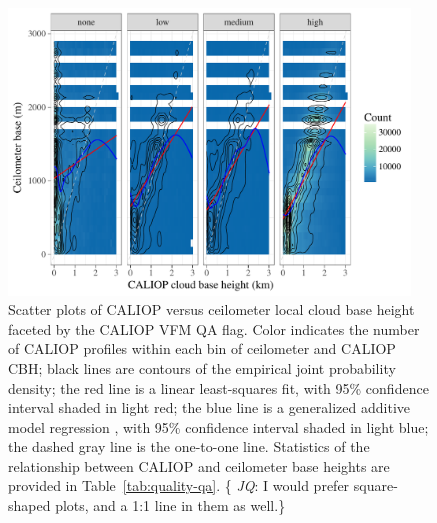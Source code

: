 \documentclass[essd,manuscript]{copernicus}\usepackage[]{graphicx}\usepackage[]{color}
\newcommand{\hlnum}[1]{\textcolor[rgb]{0.686,0.059,0.569}{#1}}%
\newenvironment{knitrout}{}{} %
\newcommand\comment[2]{\{\hlnum{ \textit{#1}: #2}\}}
\begin{document}
\begin{figure}
  \centering
\begin{knitrout}
\color{fgcolor}

{\centering \includegraphics[width=0.95\textwidth]{figure/method-eval-qual-1} 

}



\end{knitrout}
  \caption{Scatter plots of CALIOP versus ceilometer local cloud base height
    faceted by the CALIOP VFM QA flag.  Color indicates the number of CALIOP
    profiles within each bin of ceilometer and CALIOP CBH; black
    lines are contours of the empirical joint probability density; the red line
    is a linear least-squares fit, with 95\% confidence interval shaded in light
    red; the blue line is a generalized additive model regression
    \citep{Wood2004,Wood2011}, with 95\% confidence interval shaded in light
    blue; the dashed gray line is the one-to-one line.  Statistics of the
    relationship between CALIOP and ceilometer base heights are provided in
    Table~\ref{tab:quality-qa}. \comment{JQ}{I would prefer square-shaped plots, and a
  1:1 line in them as well.}}
  \label{fig:quality-qa}
\end{figure}
\end{document}
